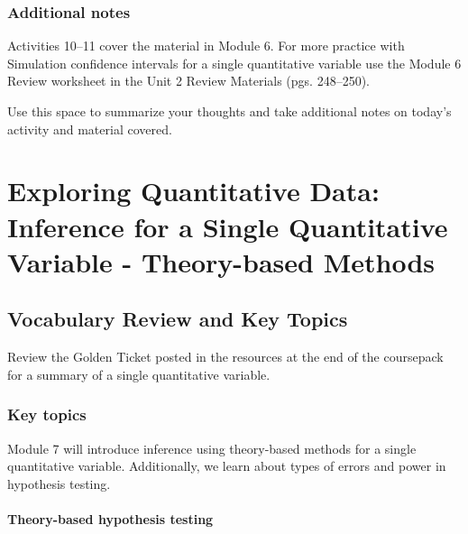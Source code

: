 \documentclass[
]{report}
\begin{document}
\subsection{Additional notes}\label{additional-notes-10}

Activities 10--11 cover the material in Module 6. For more practice with Simulation confidence intervals for a single quantitative variable use the Module 6 Review worksheet in the Unit 2 Review Materials (pgs. 248--250).

Use this space to summarize your thoughts and take additional notes on today's activity and material covered.

\newpage

\chapter{Exploring Quantitative Data: Inference for a Single Quantitative Variable - Theory-based Methods}\label{exploring-quantitative-data-inference-for-a-single-quantitative-variable---theory-based-methods}

\section{Vocabulary Review and Key Topics}\label{vocabulary-review-and-key-topics-5}

Review the Golden Ticket posted in the resources at the end of the coursepack for a summary of a single quantitative variable.

\subsection{Key topics}\label{key-topics-6}

Module 7 will introduce inference using theory-based methods for a single quantitative variable. Additionally, we learn about types of errors and power in hypothesis testing.

\subsubsection*{Theory-based hypothesis testing}\label{theory-based-hypothesis-testing}
\end{document}
